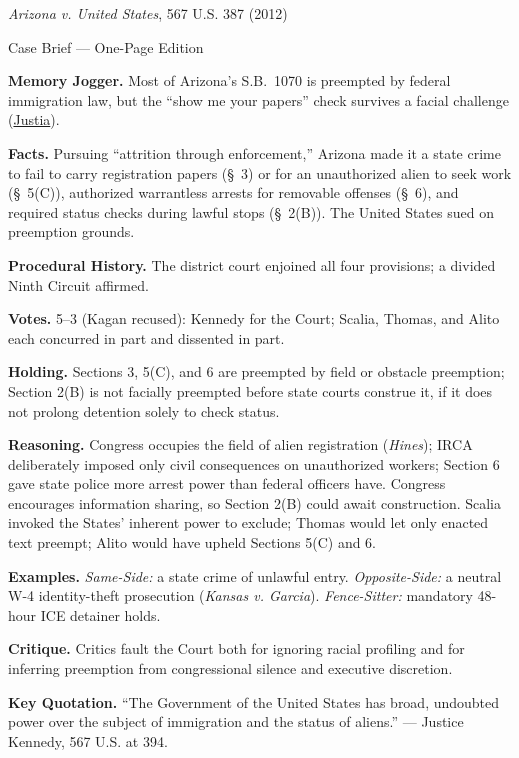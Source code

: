\documentclass[12pt]{article}
\begin{document}
\begin{center}
{\Large \textit{Arizona v. United States}, 567 U.S. 387 (2012)\par}
\vspace{0.3em}
{\normalsize Case Brief --- One-Page Edition\par}
\end{center}

\textbf{Memory Jogger.} Most of Arizona's S.B.~1070 is preempted by federal immigration law, but the ``show me your papers'' check survives a facial challenge (\href{https://supreme.justia.com/cases/federal/us/567/387/}{Justia}).

\textbf{Facts.} Pursuing ``attrition through enforcement,'' Arizona made it a state crime to fail to carry registration papers (\S~3) or for an unauthorized alien to seek work (\S~5(C)), authorized warrantless arrests for removable offenses (\S~6), and required status checks during lawful stops (\S~2(B)). The United States sued on preemption grounds.

\textbf{Procedural History.} The district court enjoined all four provisions; a divided Ninth Circuit affirmed.

\textbf{Votes.} 5--3 (Kagan recused): Kennedy for the Court; Scalia, Thomas, and Alito each concurred in part and dissented in part.

\textbf{Holding.} Sections 3, 5(C), and 6 are preempted by field or obstacle preemption; Section 2(B) is not facially preempted before state courts construe it, if it does not prolong detention solely to check status.

\textbf{Reasoning.} Congress occupies the field of alien registration (\textit{Hines}); IRCA deliberately imposed only civil consequences on unauthorized workers; Section 6 gave state police more arrest power than federal officers have. Congress encourages information sharing, so Section 2(B) could await construction. Scalia invoked the States' inherent power to exclude; Thomas would let only enacted text preempt; Alito would have upheld Sections 5(C) and 6.

\textbf{Examples.} \emph{Same-Side:} a state crime of unlawful entry. \emph{Opposite-Side:} a neutral W-4 identity-theft prosecution (\textit{Kansas v. Garcia}). \emph{Fence-Sitter:} mandatory 48-hour ICE detainer holds.

\textbf{Critique.} Critics fault the Court both for ignoring racial profiling and for inferring preemption from congressional silence and executive discretion.

\textbf{Key Quotation.} ``The Government of the United States has broad, undoubted power over the subject of immigration and the status of aliens.'' --- Justice Kennedy, 567 U.S. at 394.
\end{document}
